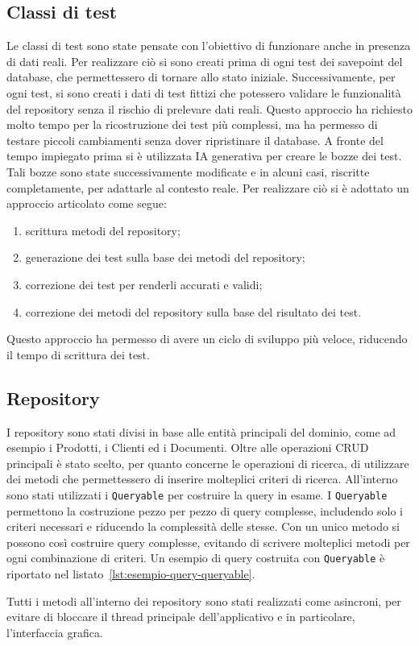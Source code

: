 \subsection{Classi di test}
Le classi di test sono state pensate con l'obiettivo di funzionare anche in presenza di dati reali.
Per realizzare ciò si sono creati prima di ogni test dei savepoint del database,
che permettessero di tornare allo stato iniziale.
Successivamente, per ogni test, si sono creati i dati di test fittizi che potessero validare
le funzionalità del repository senza
il rischio di prelevare dati reali.
Questo approccio ha richiesto molto tempo per la ricostruzione dei test più complessi, ma
ha permesso di testare piccoli cambiamenti senza dover ripristinare il database.
A fronte del tempo impiegato prima si è utilizzata \ac{IA} generativa per creare le bozze dei test.
Tali bozze sono state successivamente modificate e in alcuni casi, riscritte completamente,
per adattarle al contesto reale.
Per realizzare ciò si è adottato un approccio articolato come segue:
\begin{enumerate}
  \item scrittura metodi del repository;
  \item generazione dei test sulla base dei metodi del repository;
  \item correzione dei test per renderli accurati e validi;
  \item correzione dei metodi del repository sulla base del risultato dei test.
\end{enumerate}
Questo approccio ha permesso di avere un ciclo di sviluppo più veloce,
riducendo il tempo di scrittura dei test.
\subsection{Repository}
I repository sono stati divisi in base alle entità principali del dominio,
come ad esempio i Prodotti, i Clienti ed i Documenti.
Oltre alle operazioni \ac{CRUD} principali è stato scelto, per quanto concerne le operazioni di ricerca,
di utilizzare dei metodi che permettessero di inserire molteplici criteri di ricerca.
All'interno sono stati utilizzati i \texttt{Queryable} per costruire la query in esame.
I \texttt{Queryable} permettono la costruzione pezzo per pezzo di query complesse,
includendo solo i criteri necessari e riducendo la complessità delle stesse.
Con un unico metodo si possono  così costruire query complesse, evitando di scrivere molteplici
metodi per ogni combinazione di criteri.
Un esempio di query costruita con \texttt{Queryable} è riportato nel listato~\ref{lst:esempio-query-queryable}.

Tutti i metodi all'interno dei repository sono stati realizzati come asincroni,
per evitare di bloccare il thread principale dell'applicativo e in particolare, l'interfaccia grafica.
